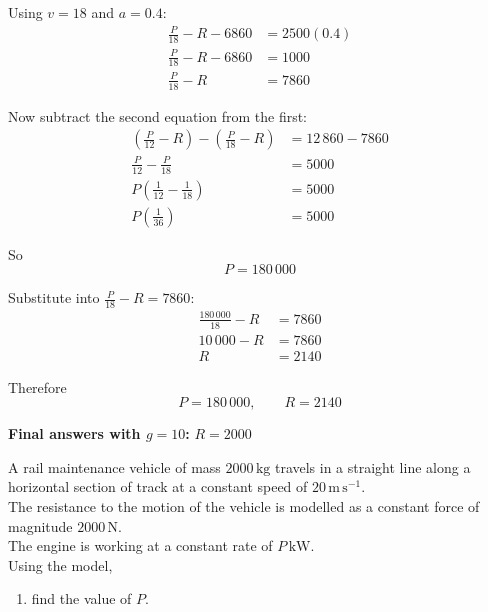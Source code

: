 \documentclass[leqno]{article}
\begin{document}
\begin{enumerate}[
  label=\textbf{\arabic*.},
  leftmargin=*,
  topsep=0pt,
  partopsep=0pt,
  parsep=0pt
]
\begin{djsSolution}
Using \(v=18\) and \(a=0.4\):
\begin{align*}
\frac{P}{18}-R-6860&=2500(0.4)\\
\frac{P}{18}-R-6860&=1000\\
\frac{P}{18}-R&=7860
\end{align*}

Now subtract the second equation from the first:
\begin{align*}
\left(\frac{P}{12}-R\right)-\left(\frac{P}{18}-R\right)&=12\,860-7860\\
\frac{P}{12}-\frac{P}{18}&=5000\\
P\left(\frac{1}{12}-\frac{1}{18}\right)&=5000\\
P\left(\frac{1}{36}\right)&=5000
\end{align*}

So
\[
P=180\,000
\]

Substitute into \(\frac{P}{18}-R=7860\):
\begin{align*}
\frac{180\,000}{18}-R&=7860\\
10\,000-R&=7860\\
R&=2140
\end{align*}

Therefore
\[
P=180\,000,\qquad R=2140
\]

\par\medskip\noindent\textbf{Final answers with \(g = 10\):} \(R = 2000\)
\end{djsSolution}


\newpage

\questionitem

A rail maintenance vehicle of mass $2000\,\mathrm{kg}$ travels in a straight line along a horizontal section of track at a constant speed of $20\,\mathrm{m\,s^{-1}}$. \\

The resistance to the motion of the vehicle is modelled as a constant force of magnitude $2000\,\mathrm{N}$. \\

The engine is working at a constant rate of $P\,\mathrm{kW}$. \\

Using the model, \\

\begin{enumerate}[label=\textbf{(\alph*)}]
  \item find the value of $P$.  \\
\end{enumerate}


\end{enumerate}
\end{document}
